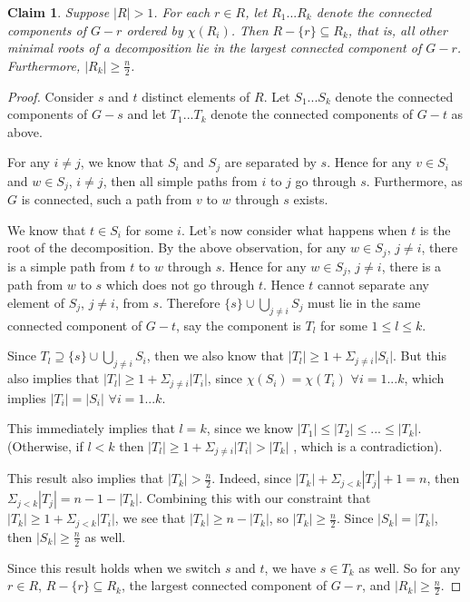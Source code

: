 \documentclass[11pt]{report}
\newtheorem{claim}{Claim}
\begin{document}
\begin{claim} Suppose $|R|>1$. For each $r\in R$, let $R_1...R_k$ denote the connected components of $G-r$ ordered by $\chi (R_i)$.  Then $R-\{r\} \subseteq R_k$, that is, all other minimal roots of a decomposition lie in the largest connected component of $G-r$. Furthermore, $|R_k|\geq \frac{n}{2}$.
\label{td_R_size_constraint}
\end{claim}
\begin{proof} 

Consider $s$ and $t$ distinct elements of $R$. Let $S_1...S_k$ denote the connected components of $G-s$ and let $T_1...T_k$ denote the connected components of $G-t$ as above.

For any $i\neq j$, we know that $S_i$ and $S_j$ are separated by $s$. Hence for any $v\in S_i$ and $w\in S_j$, $i\neq j$, then all simple paths from $i$ to $j$ go through $s$. Furthermore, as $G$ is connected, such a path from $v$ to $w$ through $s$ exists.

We know that $t\in S_i$ for some $i$. Let's now consider what happens when $t$ is the root of the decomposition. By the above observation, for any $w\in S_j$, $j\neq i$, there is a simple path from $t$ to $w$ through $s$. Hence for any $w\in S_j$, $j\neq i$, there is a path from $w$ to $s$ which does not go through $t$. Hence $t$ cannot separate any element of $S_j$, $j\neq i$, from $s$. Therefore $\{s\} \cup \displaystyle\bigcup_{j\neq i} S_j$ must lie in the same connected component of $G-t$, say the component is $T_l$ for some $1\leq l \leq k$. 


Since $T_l\supseteq \{s\}\cup \displaystyle\bigcup_{j\neq i} S_i $, then we also know that $|T_l|\geq 1+\displaystyle\Sigma_{j\neq i} |S_i| $. But this also implies that $|T_l|\geq 1+\displaystyle\Sigma_{j\neq i} |T_i| $, since $\chi(S_i)=\chi(T_i)$ $\forall i=1...k$, which implies $|T_i|=|S_i|$ $\forall i=1...k$. 

This immediately implies that $l=k$, since we know $|T_1|\leq |T_2|\leq ...\leq |T_k|$. (Otherwise, if $l<k$ then  $|T_l|\geq 1 + \displaystyle\Sigma_{j\neq i} |T_i| > |T_k|$ , which is a contradiction).

This result also implies that $|T_k|>\frac{n}{2}$. Indeed, since $|T_k|+\displaystyle\Sigma_{j<k}|T_j| + 1 = n$, then $\displaystyle\Sigma_{j<k}|T_j| = n-1-|T_k|$. Combining this with our constraint that $|T_k|\geq 1 + \displaystyle\Sigma_{j< k} |T_i|$, we see that $|T_k| \geq n -|T_k|$, so $|T_k|\geq \frac{n}{2}$. Since $|S_k|=|T_k|$, then $|S_k|\geq \frac{n}{2}$ as well.

Since this result holds when we switch $s$ and $t$, we have $s\in T_k$ as well. So for any $r\in R$, $R-\{r\}\subseteq R_k$, the largest connected component of $G-r$, and $|R_k|\geq \frac{n}{2}$.


\end{proof}
\end{document}

